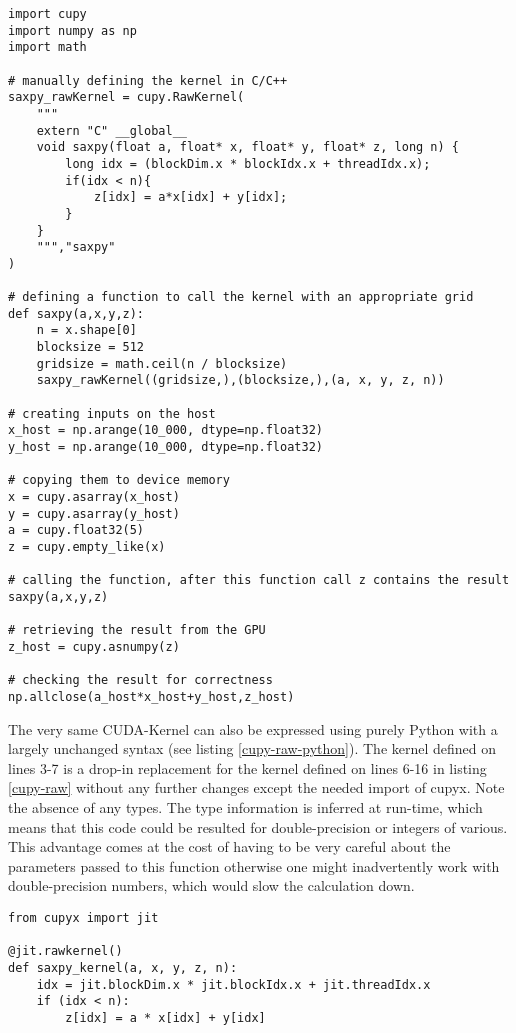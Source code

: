 \documentclass[english,11pt,a4paper,table]{article} %
\begin{document}
\begin{verbatim}
import cupy
import numpy as np
import math

# manually defining the kernel in C/C++
saxpy_rawKernel = cupy.RawKernel(
    """
    extern "C" __global__
    void saxpy(float a, float* x, float* y, float* z, long n) {
        long idx = (blockDim.x * blockIdx.x + threadIdx.x);
        if(idx < n){
            z[idx] = a*x[idx] + y[idx];
        }
    }
    ""","saxpy"
)

# defining a function to call the kernel with an appropriate grid
def saxpy(a,x,y,z):
    n = x.shape[0]
    blocksize = 512
    gridsize = math.ceil(n / blocksize)
    saxpy_rawKernel((gridsize,),(blocksize,),(a, x, y, z, n))

# creating inputs on the host
x_host = np.arange(10_000, dtype=np.float32)
y_host = np.arange(10_000, dtype=np.float32)

# copying them to device memory
x = cupy.asarray(x_host)
y = cupy.asarray(y_host)
a = cupy.float32(5)
z = cupy.empty_like(x)

# calling the function, after this function call z contains the result
saxpy(a,x,y,z)

# retrieving the result from the GPU
z_host = cupy.asnumpy(z)

# checking the result for correctness
np.allclose(a_host*x_host+y_host,z_host)
\end{verbatim}

The very same CUDA-Kernel can also be expressed using purely Python with a largely unchanged syntax (see listing \ref{cupy-raw-python}).
The kernel defined on lines 3-7 is a drop-in replacement for the kernel defined on lines 6-16 in listing \ref{cupy-raw} without any further changes except the needed import of cupyx.
Note the absence of any types.
The type information is inferred at run-time, which means that this code could be resulted for double-precision or integers of various.
This advantage comes at the cost of having to be very careful about the parameters passed to this function otherwise one might inadvertently work with double-precision numbers, which would slow the calculation down.

\begin{verbatim}
from cupyx import jit

@jit.rawkernel()
def saxpy_kernel(a, x, y, z, n):
    idx = jit.blockDim.x * jit.blockIdx.x + jit.threadIdx.x
    if (idx < n):
        z[idx] = a * x[idx] + y[idx]
\end{verbatim}
\end{document}
